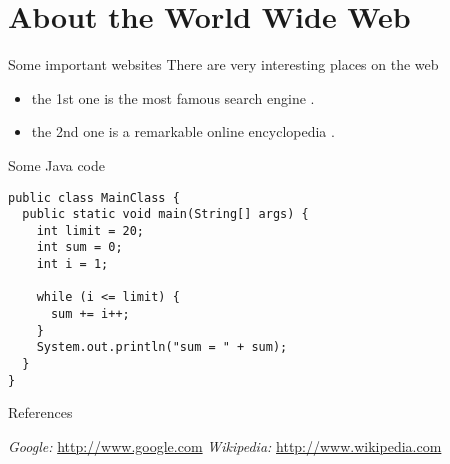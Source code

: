 \documentclass[xcolor=dvipsnames,pdf,10pt]{beamer}
\newcommand{\bi}{\begin{itemize}}
\newcommand{\ei}{\end{itemize}}
\newcommand{\tm}{\item}
\begin{document}
\section{About the World Wide Web}


\begin{frame}{Some important websites}
There are very interesting places on the web
\bi
\tm the 1st one is the most famous search engine \cite{1}.
\tm the 2nd one is a remarkable online encyclopedia \cite{2}.
\ei
\end{frame}



\begin{frame}[fragile]{Some Java code}{}

\begin{lstlisting}
public class MainClass {
  public static void main(String[] args) {
    int limit = 20;
    int sum = 0;
    int i = 1;

    while (i <= limit) {
      sum += i++;
    }
    System.out.println("sum = " + sum);
  }
}

\end{lstlisting}

\end{frame}


\begin{frame}{References}
\begin{thebibliography}{XX}
 {\emph{Google:} \url{http://www.google.com}}
 {\emph{Wikipedia:} \url{http://www.wikipedia.com}}
\end{thebibliography}
\end{frame}



\titlepageINF
\end{document}
